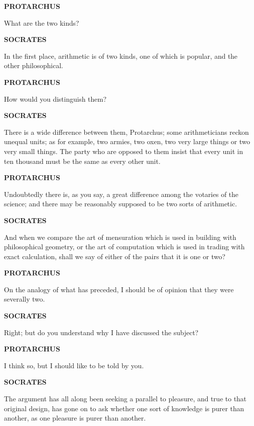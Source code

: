 \documentclass[11pt,letter]{article}
\begin{document}
\par \textbf{PROTARCHUS}
\par   What are the two kinds?

\par \textbf{SOCRATES}
\par   In the first place, arithmetic is of two kinds, one of which is popular, and the other philosophical.

\par \textbf{PROTARCHUS}
\par   How would you distinguish them?

\par \textbf{SOCRATES}
\par   There is a wide difference between them, Protarchus; some arithmeticians reckon unequal units; as for example, two armies, two oxen, two very large things or two very small things. The party who are opposed to them insist that every unit in ten thousand must be the same as every other unit.

\par \textbf{PROTARCHUS}
\par   Undoubtedly there is, as you say, a great difference among the votaries of the science; and there may be reasonably supposed to be two sorts of arithmetic.

\par \textbf{SOCRATES}
\par   And when we compare the art of mensuration which is used in building with philosophical geometry, or the art of computation which is used in trading with exact calculation, shall we say of either of the pairs that it is one or two?

\par \textbf{PROTARCHUS}
\par   On the analogy of what has preceded, I should be of opinion that they were severally two.

\par \textbf{SOCRATES}
\par   Right; but do you understand why I have discussed the subject?

\par \textbf{PROTARCHUS}
\par   I think so, but I should like to be told by you.

\par \textbf{SOCRATES}
\par   The argument has all along been seeking a parallel to pleasure, and true to that original design, has gone on to ask whether one sort of knowledge is purer than another, as one pleasure is purer than another.
\end{document}
